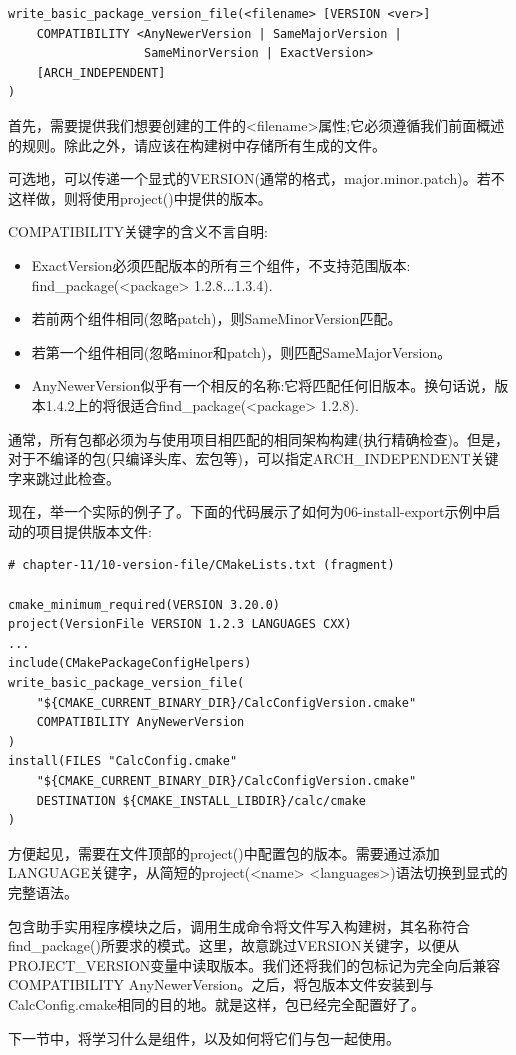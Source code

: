 \begin{lstlisting}[style=styleCMake]
write_basic_package_version_file(<filename> [VERSION <ver>]
	COMPATIBILITY <AnyNewerVersion | SameMajorVersion |
				   SameMinorVersion | ExactVersion>
	[ARCH_INDEPENDENT]
)
\end{lstlisting}

首先，需要提供我们想要创建的工件的<filename>属性;它必须遵循我们前面概述的规则。除此之外，请应该在构建树中存储所有生成的文件。

可选地，可以传递一个显式的VERSION(通常的格式，major.minor.patch)。若不这样做，则将使用project()中提供的版本。

COMPATIBILITY关键字的含义不言自明:

\begin{itemize}
\item 
ExactVersion必须匹配版本的所有三个组件，不支持范围版本: find\_package(<package> 1.2.8...1.3.4).

\item 
若前两个组件相同(忽略patch)，则SameMinorVersion匹配。

\item 
若第一个组件相同(忽略minor和patch)，则匹配SameMajorVersion。

\item 
AnyNewerVersion似乎有一个相反的名称:它将匹配任何旧版本。换句话说，版本1.4.2上的将很适合find\_package(<package> 1.2.8).
\end{itemize}

通常，所有包都必须为与使用项目相匹配的相同架构构建(执行精确检查)。但是，对于不编译的包(只编译头库、宏包等)，可以指定ARCH\_INDEPENDENT关键字来跳过此检查。

现在，举一个实际的例子了。下面的代码展示了如何为06-install-export示例中启动的项目提供版本文件:

\begin{lstlisting}[style=styleCMake]
# chapter-11/10-version-file/CMakeLists.txt (fragment)

cmake_minimum_required(VERSION 3.20.0)
project(VersionFile VERSION 1.2.3 LANGUAGES CXX)
...
include(CMakePackageConfigHelpers)
write_basic_package_version_file(
	"${CMAKE_CURRENT_BINARY_DIR}/CalcConfigVersion.cmake"
	COMPATIBILITY AnyNewerVersion
)
install(FILES "CalcConfig.cmake"
	"${CMAKE_CURRENT_BINARY_DIR}/CalcConfigVersion.cmake"
	DESTINATION ${CMAKE_INSTALL_LIBDIR}/calc/cmake
)
\end{lstlisting}

方便起见，需要在文件顶部的project()中配置包的版本。需要通过添加LANGUAGE关键字，从简短的project(<name> <languages>)语法切换到显式的完整语法。

包含助手实用程序模块之后，调用生成命令将文件写入构建树，其名称符合find\_package()所要求的模式。这里，故意跳过VERSION关键字，以便从PROJECT\_VERSION变量中读取版本。我们还将我们的包标记为完全向后兼容COMPATIBILITY AnyNewerVersion。之后，将包版本文件安装到与CalcConfig.cmake相同的目的地。就是这样，包已经完全配置好了。

下一节中，将学习什么是组件，以及如何将它们与包一起使用。







